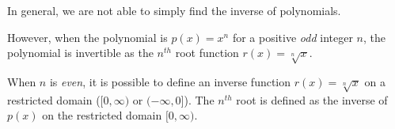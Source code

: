 \documentclass{ximera}
\begin{document}
\begin{summary}
In general, we are not able to simply find the inverse of polynomials.

However, when the polynomial is $p(x) = x^n$ for a positive {\em odd} integer $n$, the polynomial is invertible as the $n^{th}$ root function $r(x) = \sqrt[n]{x}$.

When $n$ is {\em even}, it is possible to define an inverse function $r(x) = \sqrt[n]{x}$ on a restricted domain ($[0, \infty)$ or $(-\infty,0]$). The $n^{th}$ root is defined as the inverse of $p(x)$ on the restricted domain $[0,\infty)$.
\end{summary}
\end{document}
